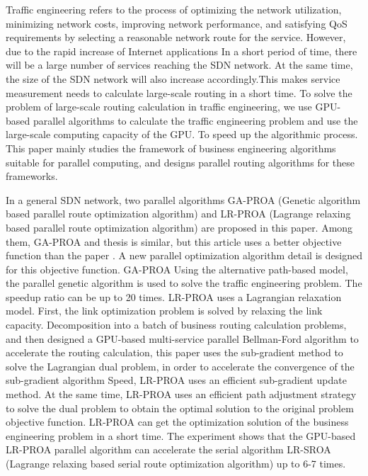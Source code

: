 \documentclass[master]{thesis-uestc}
\begin{document}
\begin{englishabstract}

Traffic engineering refers to the process of optimizing the network utilization, minimizing network costs, improving network performance, and satisfying QoS requirements by selecting a reasonable network route for the service. However, due to the rapid increase of Internet applications In a short period of time, there will be a large number of services reaching the SDN network. At the same time, the size of the SDN network will also increase accordingly.This makes service measurement needs to calculate large-scale routing in a short time. To solve the problem of large-scale routing calculation in traffic engineering, we use GPU-based parallel algorithms to calculate the traffic engineering problem and use the large-scale computing capacity of the GPU. To speed up the algorithmic process. This paper mainly studies the framework of business engineering algorithms suitable for parallel computing, and designs parallel routing algorithms for these frameworks.

In a general SDN network, two parallel algorithms GA-PROA (Genetic algorithm based parallel route optimization algorithm) and LR-PROA (Lagrange relaxing based parallel route optimization algorithm) are proposed in this paper. Among them, GA-PROA and thesis \cite{ ParaTE2 The parallelism in } is similar, but this article uses a better objective function than the paper \cite{ParaTE2}. A new parallel optimization algorithm detail is designed for this objective function. GA-PROA
Using the alternative path-based model, the parallel genetic algorithm is used to solve the traffic engineering problem. The speedup ratio can be up to 20 times. LR-PROA uses a Lagrangian relaxation model. First, the link optimization problem is solved by relaxing the link capacity. Decomposition into a batch of business routing calculation problems, and then designed a GPU-based multi-service parallel Bellman-Ford algorithm to accelerate the routing calculation, this paper uses the sub-gradient method to solve the Lagrangian dual problem, in order to accelerate the convergence of the sub-gradient algorithm Speed, LR-PROA uses an efficient sub-gradient update method. At the same time, LR-PROA uses an efficient path adjustment strategy to solve the dual problem to obtain the optimal solution to the original problem objective function. LR-PROA can get the optimization solution of the business engineering problem in a short time. The experiment shows that the GPU-based LR-PROA parallel algorithm can accelerate the serial algorithm LR-SROA (Lagrange relaxing based serial route optimization algorithm) up to 6-7 times.


\end{englishabstract}
\end{document}

